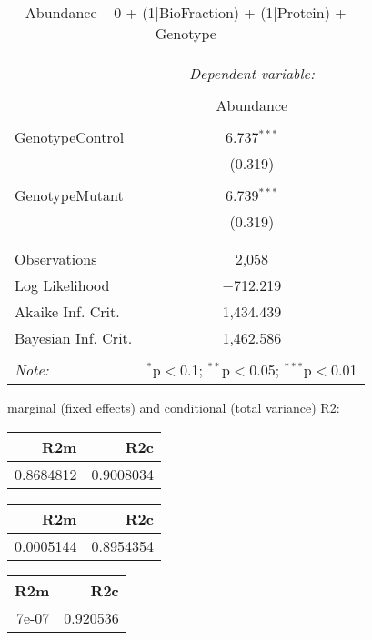 \documentclass[11pt]{report}
\begin{document}
\begin{table}[!htbp] \centering 
  \caption{Abundance ~ 0 + (1|BioFraction) + (1|Protein) + Genotype} 
  \label{} 
\begin{tabular}{@{\extracolsep{5pt}}lc} 
\\[-1.8ex]\hline 
\hline \\[-1.8ex] 
 & \multicolumn{1}{c}{\textit{Dependent variable:}} \\ 
\cline{2-2} 
\\[-1.8ex] & Abundance \\ 
\hline \\[-1.8ex] 
 GenotypeControl & 6.737$^{***}$ \\ 
  & (0.319) \\ 
  & \\ 
 GenotypeMutant & 6.739$^{***}$ \\ 
  & (0.319) \\ 
  & \\ 
\hline \\[-1.8ex] 
Observations & 2,058 \\ 
Log Likelihood & $-$712.219 \\ 
Akaike Inf. Crit. & 1,434.439 \\ 
Bayesian Inf. Crit. & 1,462.586 \\ 
\hline 
\hline \\[-1.8ex] 
\textit{Note:}  & \multicolumn{1}{r}{$^{*}$p$<$0.1; $^{**}$p$<$0.05; $^{***}$p$<$0.01} \\ 
\end{tabular} 
\end{table} 
marginal (fixed effects) and conditional (total variance) R2:

\begin{tabular}{r|r}
\hline
R2m & R2c\\
\hline
0.8684812 & 0.9008034\\
\hline
\end{tabular}

\begin{tabular}{r|r}
\hline
R2m & R2c\\
\hline
0.0005144 & 0.8954354\\
\hline
\end{tabular}

\begin{tabular}{r|r}
\hline
R2m & R2c\\
\hline
7e-07 & 0.920536\\
\hline
\end{tabular}
\end{document}
